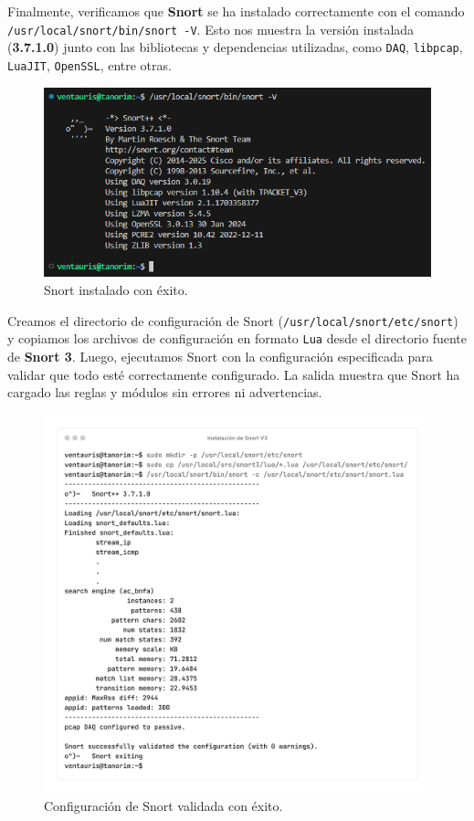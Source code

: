 \documentclass[11pt,a4paper,twoside]{report}
\begin{document}
Finalmente, verificamos que \textbf{Snort} se ha instalado correctamente con el comando \texttt{/usr/local/snort/bin/snort -V}. Esto nos muestra la versión instalada (\textbf{3.7.1.0}) junto con las bibliotecas y dependencias utilizadas, como \texttt{DAQ}, \texttt{libpcap}, \texttt{LuaJIT}, \texttt{OpenSSL}, entre otras.

\begin{figure}[H]
	\centering
	\includegraphics[scale=0.7]{instalacion_snort/24.png}
	\caption{Snort instalado con éxito.}
\end{figure}

\newpage

Creamos el directorio de configuración de Snort (\texttt{/usr/local/snort/etc/snort}) y copiamos los archivos de configuración en formato \texttt{Lua} desde el directorio fuente de \textbf{Snort 3}. Luego, ejecutamos Snort con la configuración especificada para validar que todo esté correctamente configurado. La salida muestra que Snort ha cargado las reglas y módulos sin errores ni advertencias.

\begin{figure}[H]
	\centering
	\includegraphics[scale=0.12]{instalacion_snort/25-25.png}
	\caption{Configuración de Snort validada con éxito.}
\end{figure}
\end{document}

